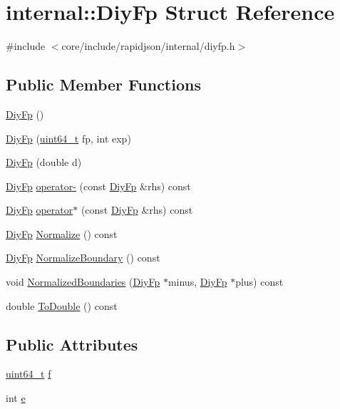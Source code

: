 \hypertarget{structinternal_1_1DiyFp}{}\section{internal\+:\+:Diy\+Fp Struct Reference}
\label{structinternal_1_1DiyFp}


{\ttfamily \#include $<$core/include/rapidjson/internal/diyfp.\+h$>$}

\subsection*{Public Member Functions}
\begin{DoxyCompactItemize}
\item 
\hyperlink{structinternal_1_1DiyFp_aea27f027c58a55245d700df08be4ff7e}{Diy\+Fp} ()
\item 
\hyperlink{structinternal_1_1DiyFp_a9a8f2f5c49dfa0dee4a527f0829cc2e5}{Diy\+Fp} (\hyperlink{stdint_8h_aec6fcb673ff035718c238c8c9d544c47}{uint64\+\_\+t} fp, int exp)
\item 
\hyperlink{structinternal_1_1DiyFp_adc132c7da4c8e3ee5ae12efdcf6dbf7c}{Diy\+Fp} (double d)
\item 
\hyperlink{structinternal_1_1DiyFp}{Diy\+Fp} \hyperlink{structinternal_1_1DiyFp_ade3efb95107203f2327fc3d5a802d4b7}{operator-\/} (const \hyperlink{structinternal_1_1DiyFp}{Diy\+Fp} \&rhs) const 
\item 
\hyperlink{structinternal_1_1DiyFp}{Diy\+Fp} \hyperlink{structinternal_1_1DiyFp_ab536022d225b3014c98517a2dec4b986}{operator$\ast$} (const \hyperlink{structinternal_1_1DiyFp}{Diy\+Fp} \&rhs) const 
\item 
\hyperlink{structinternal_1_1DiyFp}{Diy\+Fp} \hyperlink{structinternal_1_1DiyFp_adae1948b1bb65d950cd3801a4a2bb7fd}{Normalize} () const 
\item 
\hyperlink{structinternal_1_1DiyFp}{Diy\+Fp} \hyperlink{structinternal_1_1DiyFp_a1a4589d19230c9930d7f3dd5a9b7f7e7}{Normalize\+Boundary} () const 
\item 
void \hyperlink{structinternal_1_1DiyFp_a64e623c1742d1d5ad551ab456f0deb62}{Normalized\+Boundaries} (\hyperlink{structinternal_1_1DiyFp}{Diy\+Fp} $\ast$minus, \hyperlink{structinternal_1_1DiyFp}{Diy\+Fp} $\ast$plus) const 
\item 
double \hyperlink{structinternal_1_1DiyFp_a9bbdcfcf5d1b3a7b16a8f5f860d74038}{To\+Double} () const 
\end{DoxyCompactItemize}
\subsection*{Public Attributes}
\begin{DoxyCompactItemize}
\item 
\hyperlink{stdint_8h_aec6fcb673ff035718c238c8c9d544c47}{uint64\+\_\+t} \hyperlink{structinternal_1_1DiyFp_a09b9217a86e8a2e6aa8d2d48fc351008}{f}
\item 
int \hyperlink{structinternal_1_1DiyFp_afa9db335eeb61c7f966d888d89b1e6f2}{e}
\end{DoxyCompactItemize}
